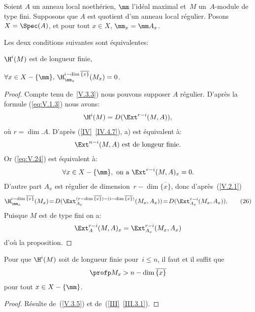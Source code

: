 Soient $A$ un anneau local noeth\'erien, $\mm$ l'id\'eal maximal et~$M$ un~$A$-module de type fini. Supposons que $A$ est quotient d'un anneau local r\'egulier. Posons $X=\Spec(A)$, et pour tout $x\in X$, $\mm_{x}=\mm A_{x}$.

\begin{proposition} \label{V.3.5}
Les deux conditions suivantes sont \'equivalentes:
\begin{enumeratea}
\item
$\H^{i}(M)$ est de longueur finie,
\item
$\forall x\in X-\{ \mm\}, \, \H_{\mm_{x}}^{i-\dim\overline{\{ x\} }}(M_{x})=0$.
\end{enumeratea}
\end{proposition}

\begin{proof}
Compte tenu de~\ref{V.3.3}) nous pouvons supposer $A$ r\'egulier. D'apr\`es la formule (\ref{eq:V.1.3}) nous avons:
$$
\H^{i}(M)=D(\Ext^{r-i}(M, A)),
$$
o\`u $r=\dim.A$. D'apr\`es (\ref{IV}~\ref{IV.4.7}), a) est
\'equivalent \`a:
\begin{equation} \label{eq:V.24} \Ext^{n-i}(M, A)\textrm{ est de longeur finie.}
\end{equation}
Or (\ref{eq:V.24}) est \'equivalent \`a:
\begin{equation} \label{eq:V.25} \forall x\in X-\{ \mm\}, \textrm{ on~a }\Ext^{r-i}(M, A)_{x}=0.
\end{equation}
D'autre part $A_{x}$ est r\'egulier de dimension~$r-\dim\overline{\{ x\} }$, donc d'apr\`es~(\ref{V.2.1})
\begin{equation*}%
\H_{\mm_{x}}^{i-\dim\overline{\{ x\} }}(M_{x})\!=\!D(\Ext_{A_{x}}^{(r-\dim\overline{\{ x\} })-(i-\dim\overline{\{ x\} })}(M_{x}, A_{x}))\!=\!D(\Ext_{A_{x}}^{r-i}(M_{x}, A_{x})).\tag*{(26)}
\end{equation*}
Puisque $M$ est de type fini on a:
$$
\Ext_{A}^{r-i}(M, A)_{x}=\Ext_{A_{x}}^{r-i}(M_{x}, A_{x})$$
d'o\`u la proposition.
\skipqed
\end{proof}

\begin{corollaire} \label{V.3.6} Pour que $\H^{i}(M)$ soit de longueur finie pour~$i\leq n$, il faut et il suffit que
$$
\profp M_{x}>n-\dim\overline{\{ x\} }$$
pour tout $x\in X-\{ \mm\}$.
\end{corollaire}

\begin{proof}
R\'esulte de~(\ref{V.3.5}) et de~(\ref{III}~\ref{III.3.1}).
\skipqed
\end{proof}

